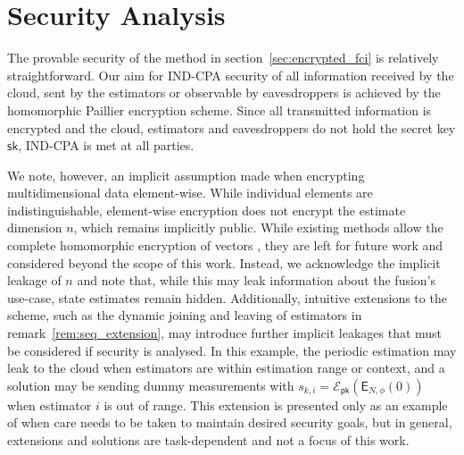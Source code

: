 \documentclass[letterpaper, 10 pt, conference]{ieeeconf}
\begin{document}
% 
%                                 
%                                 
%                                 
% 
\section{Security Analysis}\label{sec:security}
The provable security of the method in section~\ref{sec:encrypted_fci} is relatively straightforward. Our aim for IND-CPA security of all information received by the cloud, sent by the estimators or observable by eavesdroppers is achieved by the homomorphic Paillier encryption scheme. Since all transmitted information is encrypted and the cloud, estimators and eavesdroppers do not hold the secret key $\mathsf{sk}$, IND-CPA is met at all parties.

We note, however, an implicit assumption made when encrypting multidimensional data element-wise. While individual elements are indistinguishable, element-wise encryption does not encrypt the estimate dimension $n$, which remains implicitly public. While existing methods allow the complete homomorphic encryption of vectors \cite{alexandruPrivateWeightedSum2020}, they are left for future work and considered beyond the scope of this work. Instead, we acknowledge the implicit leakage of $n$ and note that, while this may leak information about the fusion's use-case, state estimates remain hidden. Additionally, intuitive extensions to the scheme, such as the dynamic joining and leaving of estimators in remark~\ref{rem:seq_extension}, may introduce further implicit leakages that must be considered if security is analysed. In this example, the periodic estimation may leak to the cloud when estimators are within estimation range or context, and a solution may be sending dummy measurements with $s_{k,i}=\mathcal{E}_{\mathsf{pk}}(\mathsf{E}_{N,\phi}(0))$ when estimator $i$ is out of range. This extension is presented only as an example of when care needs to be taken to maintain desired security goals, but in general, extensions and solutions are task-dependent and not a focus of this work.


% 
%                                 
%                                 
%                                 
% 
\end{document}
